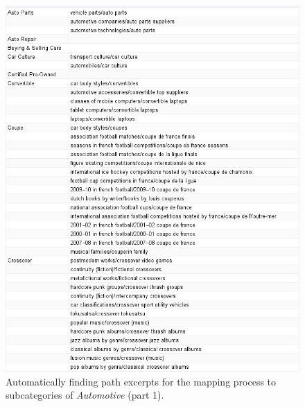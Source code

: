 \begin{figure}
\centering
\includegraphics[width=\textwidth]{Chapters/Results/Automatic_classification_1}
\caption[Automatic mapping between categories and path excerpts, part 1]{Automatically finding path excerpts for the mapping process to subcategories of \emph{Automotive} (part 1).}
\label{fig:autoclassification1}
\end{figure}


